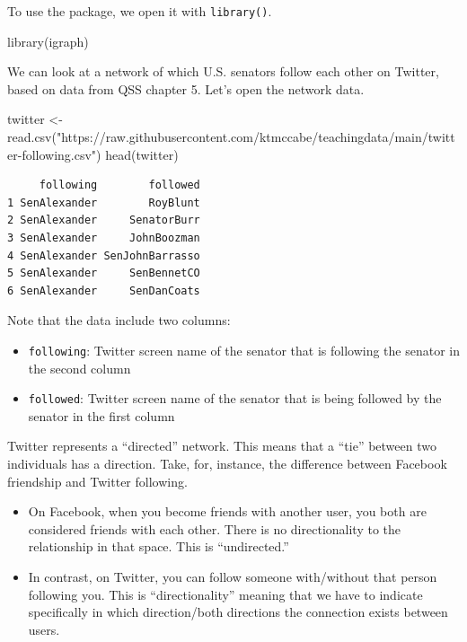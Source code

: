 \documentclass[
  letterpaper,
  DIV=11,
  numbers=noendperiod]{scrreprt}
\newenvironment{Shaded}{\begin{snugshade}}{\end{snugshade}}
\newcommand{\FunctionTok}[1]{\textcolor[rgb]{0.28,0.35,0.67}{#1}}
\newcommand{\NormalTok}[1]{\textcolor[rgb]{0.00,0.23,0.31}{#1}}
\newcommand{\OtherTok}[1]{\textcolor[rgb]{0.00,0.23,0.31}{#1}}
\newcommand{\StringTok}[1]{\textcolor[rgb]{0.13,0.47,0.30}{#1}}
\providecommand{\tightlist}{%
  \setlength{\itemsep}{0pt}\setlength{\parskip}{0pt}}\usepackage{longtable,booktabs,array}
\begin{document}
To use the package, we open it with \texttt{library()}.

\begin{Shaded}
\begin{Highlighting}[]
\FunctionTok{library}\NormalTok{(igraph)}
\end{Highlighting}
\end{Shaded}

We can look at a network of which U.S. senators follow each other on
Twitter, based on data from QSS chapter 5. Let's open the network data.

\begin{Shaded}
\begin{Highlighting}[]
\NormalTok{twitter }\OtherTok{\textless{}{-}} \FunctionTok{read.csv}\NormalTok{(}\StringTok{"https://raw.githubusercontent.com/ktmccabe/teachingdata/main/twitter{-}following.csv"}\NormalTok{)}
\FunctionTok{head}\NormalTok{(twitter)}
\end{Highlighting}
\end{Shaded}

\begin{verbatim}
     following        followed
1 SenAlexander        RoyBlunt
2 SenAlexander     SenatorBurr
3 SenAlexander     JohnBoozman
4 SenAlexander SenJohnBarrasso
5 SenAlexander     SenBennetCO
6 SenAlexander     SenDanCoats
\end{verbatim}

Note that the data include two columns:

\begin{itemize}
\tightlist
\item
  \texttt{following}: Twitter screen name of the senator that is
  following the senator in the second column
\item
  \texttt{followed}: Twitter screen name of the senator that is being
  followed by the senator in the first column
\end{itemize}

Twitter represents a ``directed'' network. This means that a ``tie''
between two individuals has a direction. Take, for, instance, the
difference between Facebook friendship and Twitter following.

\begin{itemize}
\tightlist
\item
  On Facebook, when you become friends with another user, you both are
  considered friends with each other. There is no directionality to the
  relationship in that space. This is ``undirected.''
\item
  In contrast, on Twitter, you can follow someone with/without that
  person following you. This is ``directionality'' meaning that we have
  to indicate specifically in which direction/both directions the
  connection exists between users.
\end{itemize}
\end{document}
